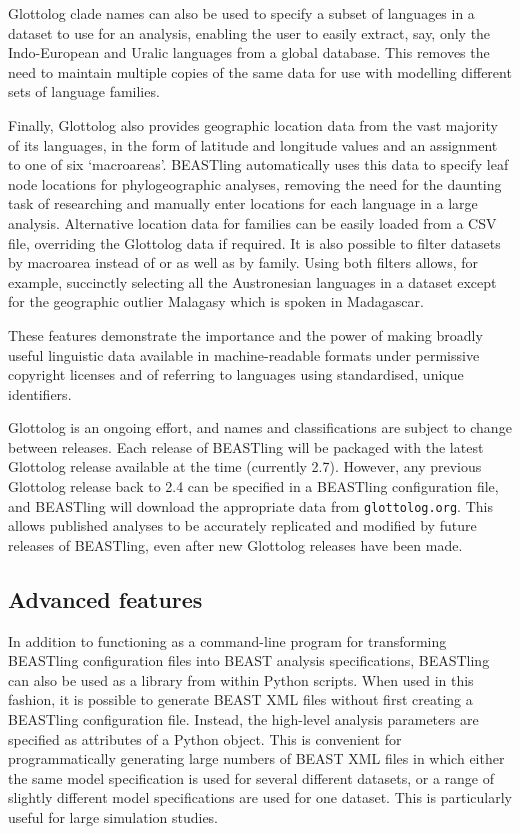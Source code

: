 \documentclass[twocolumn,10pt]{scrartcl}
\begin{document}
Glottolog clade names can also be used to specify a subset of languages in a dataset to use for an analysis, enabling the user to easily extract, say, only the Indo-European and Uralic languages from a global database.  This removes the need to maintain multiple copies of the same data for use with modelling different sets of language families.

Finally, Glottolog also provides geographic location data from the vast majority of its languages, in the form of latitude and longitude values and an assignment to one of six `macroareas'\cite{Hammarstroem2014}.  BEASTling automatically uses this data to specify leaf node locations for phylogeographic analyses, removing the need for the daunting task of researching and manually enter locations for each language in a large analysis.  Alternative location data for families can be easily loaded from a CSV file, overriding the Glottolog data if required.  It is also possible to filter datasets by macroarea instead of or as well as by family.  Using both filters allows, for example, succinctly selecting all the Austronesian languages in a dataset except for the geographic outlier Malagasy which is spoken in Madagascar.

These features demonstrate the importance and the power of making broadly useful linguistic data available in machine-readable formats under permissive copyright licenses and of referring to languages using standardised, unique identifiers.

Glottolog is an ongoing effort, and names and classifications are subject to change between releases.  Each release of BEASTling will be packaged with the latest Glottolog release available at the time (currently 2.7).  However, any previous Glottolog release back to 2.4 can be specified in a BEASTling configuration file, and BEASTling will download the appropriate data from \texttt{glottolog.org}.  This allows published analyses to be accurately replicated and modified by future releases of BEASTling, even after new Glottolog releases have been made.

\subsection{Advanced features}

In addition to functioning as a command-line program for transforming BEASTling configuration files into BEAST analysis specifications, BEASTling can also be used as a library from within Python scripts.  When used in this fashion, it is possible to generate BEAST XML files without first creating a BEASTling configuration file.  Instead, the high-level analysis parameters are specified as attributes of a Python object.  This is convenient for programmatically generating large numbers of BEAST XML files in which either the same model specification is used for several different datasets, or a range of slightly different model specifications are used for one dataset.  This is particularly useful for large simulation studies.
\end{document}
